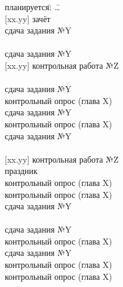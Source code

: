 
\newcommand*{\ccurr}{\color{violet}}
\newcommand*{\cctrl}{\color{DarkRed!80}}
\newcommand*{\caddi}{\color{blue!70}}
\newcommand*{\ctask}{\color{gray}}
\newcommand*{\missed}{\color{gray}\strikeThrough}


\begin{multicols}{2}\raggedcolumns\columnseprule=0.1pt
\begin{tabbing}
    планируется:\quad\=%
            \phantom{[00.00]} \= \ldots \\[1em]

    \>\cctrl         [xx.yy] зачёт \\
    \>               [xx.yy] сдача задания №Y \\
    \>               [xx.yy] \\
    \>\>\ctask               сдача задания №Y \\
    \>\cctrl         [xx.yy] контрольная работа №Z \\
    \>               [xx.yy] \\
    \>\>\ctask               сдача задания №Y \\
    \>               [xx.yy] контрольный опрос (глава X) \\
    \>\>\ctask               сдача задания №Y \\
    \>               [xx.yy] контрольный опрос (глава X) \\
    \>\>\ctask               сдача задания №Y \\
    \>               [xx.yy] \\
    \>\cctrl         [xx.yy] контрольная работа №Z \\
    \>      \missed{{[xx.yy]}} праздник \\
    \>               [xx.yy] контрольный опрос (глава X) \\
    \>               [xx.yy] контрольный опрос (глава X) \\
    \>\>\ctask               сдача задания №Y \\
    \>               [xx.yy] \\
    \>\>\ctask               сдача задания №Y \\
    \>               [xx.yy] контрольный опрос (глава X) \\
    \>\>\ctask               сдача задания №Y \\
    \>               [xx.yy] контрольный опрос (глава X) \\
    \>               [xx.yy] контрольный опрос (глава X) \\[1em]


\end{tabbing}
\end{multicols}
